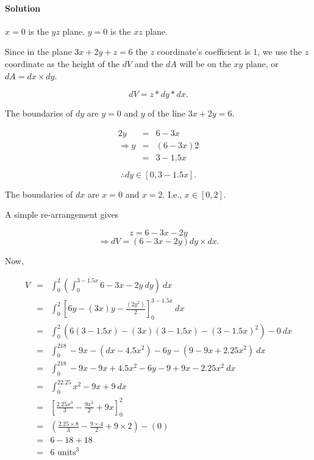 
\paragraph{Solution} 

$x=0$ is the $yz$ plane. $y=0$ is the $xz$ plane.

Since in the plane $3x+2y+z=6$ the $z$ coordinate's coefficient is $1$, we use the $z$ coordinate as the height of the $dV$ and the $dA$ will be on the $xy$ plane, or $dA=dx\times dy$.

\[dV=z*dy*dx.\]

The boundaries of $dy$ are $y=0$ and $y$ of the line $3x+2y=6$.

\begin{eqnarray*}
	2y&=&6-3x\\
	\Rightarrow y&=&\left(6-3x\right)2\\
	&=&3-1.5x
\end{eqnarray*}

\[\therefore dy\in\left[0,3-1.5x\right].\]

The boundaries of $dx$ are $x=0$ and $x=2$. I.e., $x\in\left[0,2\right]$.

A simple re-arrangement gives

\[z=6-3x-2y\]
\[\Rightarrow dV=\left(6-3x-2y\right)dy\times dx.\]

Now,

\begin{eqnarray*}
	V&=&\int_0^2\left(\int_0^{3-1.5x}6-3x-2y~dy\right)~dx\\
	&=&\int_0^2\left[6y-\left(3x\right)y-\frac{\left(2y^2\right)}{2}\right]_0^{3-1.5x}~dx\\
	&=&\int_0^2\left(6\left(3-1.5x\right)-\left(3x\right)\left(3-1.5x\right)-\left(3-1.5x\right)^2\right)-0~dx\\
	&=&\int_0^218-9x-\left(dx-4.5x^2\right)-6y-\left(9-9x+2.25x^2\right)~dx\\
	&=&\int_0^218-9x-9x+4.5x^2-6y-9+9x-2.25x^2~dx\\
	&=&\int_0^22.25x^2-9x+9~dx\\
	&=&\left[\frac{2.25x^3}{3}-\frac{9x^2}{2}+9x\right]_0^2\\
	&=&\left(\frac{2.25\times8}{3}-\frac{9\times4}{2}+9\times2\right)-\left(0\right)\\
	&=&6-18+18\\
	&=&6\mbox{ units}^3
\end{eqnarray*}


